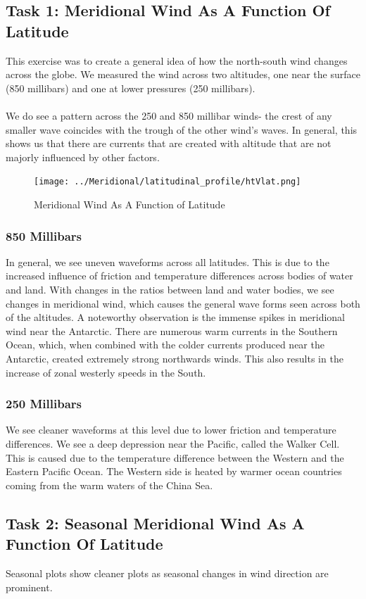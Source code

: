 \documentclass[hidelinks]{article}
\begin{document}
\subsection{Task 1: Meridional Wind As A Function Of Latitude}
This exercise was to create a general idea of how the north-south wind changes across the globe. We measured the wind across two altitudes, one near the surface (850 millibars) and one at lower pressures (250 millibars).\\\\
We do see a pattern across the 250 and 850 millibar winds- the crest of any smaller wave coincides with the trough of the other wind's waves.  In general, this shows us that there are currents that are created with altitude that are not majorly influenced by other factors.
\begin{figure}[h!]
	\centering
	\texttt{[image: ../Meridional/latitudinal\_profile/htVlat.png]}
	\caption{Meridional Wind As A Function of Latitude}
\end{figure}
\subsubsection{850 Millibars}
In general, we see uneven waveforms across all latitudes. This is due to the increased influence of friction and temperature differences across bodies of water and land. With changes in the ratios between land and water bodies, we see changes in meridional wind, which causes the general wave forms seen across both of the altitudes.
A noteworthy observation is the immense spikes in meridional wind near the Antarctic. There are numerous warm currents in the Southern Ocean, which, when combined with the colder currents produced near the Antarctic, created extremely strong northwards winds. This also results in the increase of zonal westerly speeds in the South.
\subsubsection{250 Millibars}
We see cleaner waveforms at this level due to lower friction and temperature differences. We see a deep depression near the Pacific, called the Walker Cell. This is caused due to the temperature difference between the Western and the Eastern Pacific Ocean. The Western side is heated by warmer ocean countries coming from the warm waters of the China Sea.

\subsection{Task 2: Seasonal Meridional Wind As A Function Of Latitude}
Seasonal plots show cleaner plots as seasonal changes in wind direction are prominent.
\end{document}
